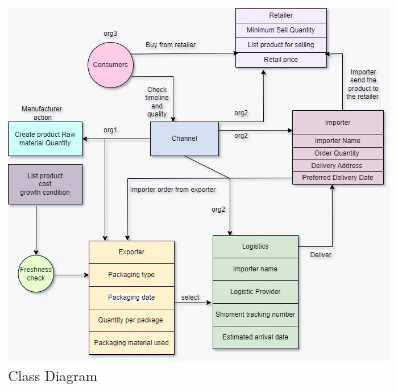 \begin{figure}[htbp]
        \centering
        \includegraphics[width=0.9\textwidth]{Chapters/Chapter_5/figures/data_flow.jpg}
        \caption{Class Diagram}
        \label{fig:figure5_5}
        \end{figure}
    
    
    
    
    
    
    
    